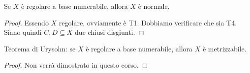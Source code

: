 \begin{thm}
  Se $X$ è regolare a base numerabile, allora $X$ è normale.
\end{thm}

\begin{proof}
  Essendo $X$ regolare, ovviamente è T1. Dobbiamo verificare che sia T4. Siano quindi $C, D \subseteq X$ due chiusi disgiunti.
\end{proof}

\begin{thm}
  Teorema di Urysohn: se $X$ è regolare a base numerabile, allora $X$ è metrizzabile.
\end{thm}

\begin{proof}
  Non verrà dimostrato in questo corso.
\end{proof}
